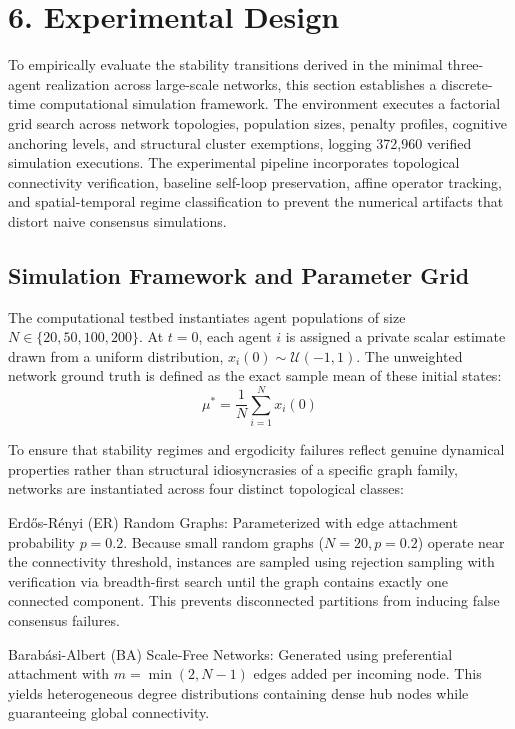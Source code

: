 \section{6. Experimental Design}
To empirically evaluate the stability transitions derived in the minimal three-agent realization across large-scale networks, this section establishes a discrete-time computational simulation framework\cite{degroot1974reaching}. The environment executes a factorial grid search across network topologies, population sizes, penalty profiles, cognitive anchoring levels, and structural cluster exemptions, logging 372,960 verified simulation executions\cite{degroot1974reaching,acemoglu2013opinion}. The experimental pipeline incorporates topological connectivity verification, baseline self-loop preservation, affine operator tracking, and spatial-temporal regime classification to prevent the numerical artifacts that distort naive consensus simulations\cite{acemoglu2013opinion}.

\subsection{Simulation Framework and Parameter Grid}
The computational testbed instantiates agent populations of size $N \in \{20,50,100,200\}$\cite{degroot1974reaching}. At $t = 0$, each agent $i$ is assigned a private scalar estimate drawn from a uniform distribution, $x_i(0) \sim \mathcal{U}(-1, 1)$\cite{degroot1974reaching}. The unweighted network ground truth is defined as the exact sample mean of these initial states\cite{degroot1974reaching}: $$\mu^* = \frac{1}{N} \sum_{i=1}^N x_i(0)$$

To ensure that stability regimes and ergodicity failures reflect genuine dynamical properties rather than structural idiosyncrasies of a specific graph family, networks are instantiated across four distinct topological classes\cite{degroot1974reaching}:

Erdős-Rényi (ER) Random Graphs: Parameterized with edge attachment probability $p = 0.2$\cite{degroot1974reaching}. Because small random graphs ($N = 20, p = 0.2$) operate near the connectivity threshold, instances are sampled using rejection sampling with verification via breadth-first search until the graph contains exactly one connected component\cite{acemoglu2013opinion}. This prevents disconnected partitions from inducing false consensus failures\cite{acemoglu2013opinion}.

Barabási-Albert (BA) Scale-Free Networks: Generated using preferential attachment with $m = \min(2, N - 1)$ edges added per incoming node\cite{degroot1974reaching,friedkin1990social}. This yields heterogeneous degree distributions containing dense hub nodes while guaranteeing global connectivity\cite{acemoglu2013opinion}.

